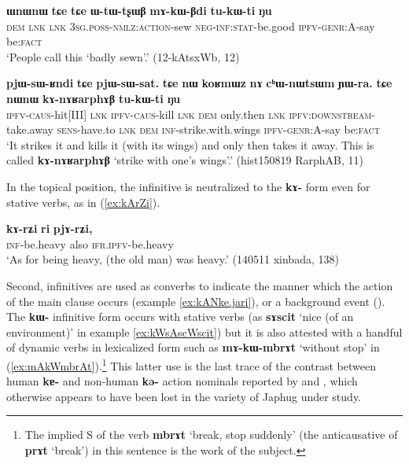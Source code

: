 \documentclass[oneside,a4paper,11pt]{article}
\newcommand{\ipa}[1]{\textbf{\phon#1}} %
\newcommand{\jpg}[2]{\ipa{#1} `#2'} %
\begin{document}
\begin{exe}
\ex  \label{ex:mAkWBdi}
 \gll \ipa{ɯnɯnɯ} 	\ipa{tɕe} 	\ipa{tɕe} 	\ipa{ɯ-tɯ-tʂɯβ} 	\ipa{mɤ-kɯ-βdi} 	\ipa{tu-kɯ-ti} 	\ipa{ŋu} \\ 
 \textsc{dem} \textsc{lnk} \textsc{lnk} \textsc{3sg.poss-nmlz:action}-sew \textsc{neg-inf:stat}-be.good  \textsc{ipfv-genr}:A-say be:\textsc{fact}  \\
\glt  `People call this `badly sewn'.'  (12-kAtsxWb, 12)
\end{exe}

\begin{exe}
\ex \label{ex:kAnARarphAB}
 \gll \ipa{pjɯ-sɯ-ʁndi} 	\ipa{tɕe} 	\ipa{pjɯ-sɯ-sat.} \ipa{tɕe} 	\ipa{nɯ} 	\ipa{koʁmɯz} 	\ipa{nɤ} 	\ipa{cʰɯ-nɯtsɯm} 	\ipa{ɲɯ-ra.} \ipa{tɕe} 	\ipa{nɯnɯ} 	\ipa{kɤ-nɤʁarphɤβ} 	\ipa{tu-kɯ-ti} 	\ipa{ŋu} \\
 \textsc{ipfv-caus}-hit[III]  \textsc{lnk} \textsc{ipfv-caus}-kill \textsc{lnk} \textsc{dem} only.then \textsc{lnk} \textsc{ipfv:downstream}-take.away \textsc{sens}-have.to \textsc{lnk} \textsc{dem} \textsc{inf}-strike.with.wings \textsc{ipfv-genr}:A-say be:\textsc{fact}  \\
 \glt `It strikes it and kills it (with its wings) and only then takes it away. This is called \ipa{kɤ-nɤʁarphɤβ} `strike with one's wings'.' (hist150819 RarphAB, 11)
\end{exe}

In the topical position, the infinitive is neutralized to the \ipa{kɤ-} form even for stative verbs, as in (\ref{ex:kArZi}).

\begin{exe}
\ex \label{ex:kArZi}
 \gll
 \ipa{kɤ-rʑi} 	\ipa{ri} 	\ipa{pjɤ-rʑi,} 	  \\
 \textsc{inf}-be.heavy also \textsc{ifr.ipfv}-be.heavy \\
 \glt `As for being heavy, (the old man) was heavy.'  (140511 xinbada, 138)
\end{exe}

Second, infinitives are used as converbs to indicate the manner which the action of the main clause occurs (example \ref{ex:kANke.jari}), or a background event (\citealt{jacques14linking}). The \ipa{kɯ-} infinitive form occurs with stative verbs (as \jpg{sɤscit}{nice (of an environment)} in example \ref{ex:kWsAscWscit}) but it is also attested with a handful of dynamic verbs in lexicalized form such as \ipa{mɤ-kɯ-mbrɤt} `without stop' in (\ref{ex:mAkWmbrAt}).\footnote{The implied S of the verb \jpg{mbrɤt}{break, stop suddenly} (the anticausative of  \jpg{prɤt}{break}) in this sentence is the work of the subject.  } This latter use is the last trace of the contrast between human \ipa{kɐ-} and non-human \ipa{kə-} action nominals reported by \citet[476]{sun12complementation} and \citealt{jackson14morpho}, which otherwise appears to have been lost in the variety of Japhug under study.
\end{document}
